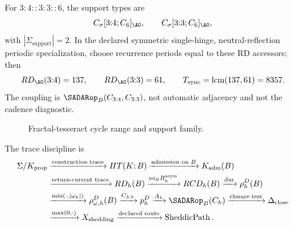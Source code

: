 For \(3{:}4::3{:}3::6\), the support types are
\[
C_\sigma[3{:}4;C_6]_{\AO},
\qquad
C_\sigma[3{:}3;C_6]_{\AO},
\]
with \(|\Sigma_{\mathrm{support}}|=2\). In the declared symmetric single-hinge, neutral-reflection periodic specialization, choose recurrence periods equal to these RD accessors; then
\[
RD_{\AO}(3{:}4)=137,
\qquad
RD_{\AO}(3{:}3)=61,
\qquad
T_{\mathrm{sync}}=\operatorname{lcm}(137,61)=8357.
\]
The coupling is \(\SADARop_B(C_{3{:}4},C_{3{:}3})\), not automatic adjacency and not the cadence diagnostic.

\begin{figure}[H]
\centering
{}
\caption{Fractal-tesseract cycle range and support family.}
\label{fig:fractal-tesseract-beat-family}
\end{figure}

The trace discipline is
\begin{equation}
\begin{aligned}
\Sigma/K_{\mathrm{prop}}
&\xrightarrow{\text{construction trace}}
HT(K;B)
\xrightarrow{\text{admission on }B}
K_{\mathrm{adm}}(B)\\
&\xrightarrow{\text{return-current trace}}
RD_h(B)
\xrightarrow{\bowtie_B R^{\mathrm{asym}}_h}
RCD_h(B)
\xrightarrow{\operatorname{dur}}
\rho_h^D(B)\\
&\xrightarrow{\min(\cdot,|\omega_h|)}
\rho^D_{\omega,h}(B)
\xrightarrow{C_{3,h}}
p_h^D
\xrightarrow{A_h}
\SADARop_B(C_h)
\xrightarrow{\text{closure test}}
\Delta_{\mathrm{close}}\\
&\xrightarrow{\max(0,\cdot)}
X_{\mathrm{shedding}}
\xrightarrow{\text{declared route}}
\operatorname{SheddicPath}.
\end{aligned}
\label{eq:support-trace-spine}
\end{equation}
